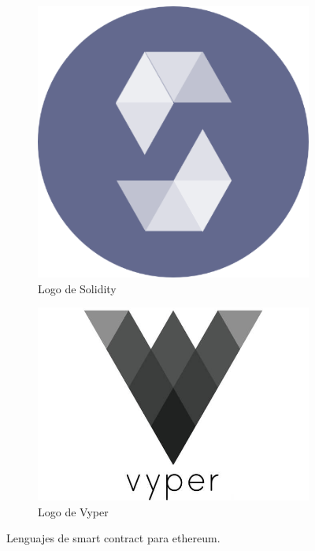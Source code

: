\begin{figure}[hbt]
	\centering
	\begin{subfigure}[b]{0.4\linewidth}
		\centering
		\includegraphics[width=0.5\linewidth]{figs/EstadoArte/Ethereum/solidityLOGO}
		\caption{Logo de Solidity}\label{fig:solProgram}
	\end{subfigure} 
	\begin{subfigure}[b]{0.4\linewidth}
		\centering
		\includegraphics[width=0.6\linewidth]{figs/EstadoArte/Ethereum/vyperLOGO}
		\caption{Logo de Vyper}\label{fig:vyperProgram}
	\end{subfigure} 
	\caption[Lenguajes de Smart Contract]{Lenguajes de smart contract para ethereum.}
	\label{fig:programas}
\end{figure}

